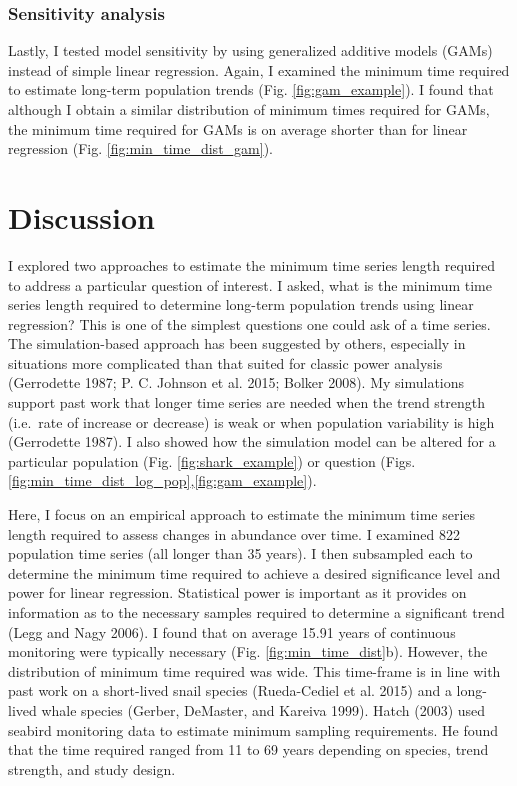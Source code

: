 \documentclass[12pt,]{article}
\begin{document}
\begin{spacing}{2}
\subsubsection{Sensitivity analysis}\label{sensitivity-analysis}

Lastly, I tested model sensitivity by using generalized additive models
(GAMs) instead of simple linear regression. Again, I examined the
minimum time required to estimate long-term population trends (Fig.
\ref{fig:gam_example}). I found that although I obtain a similar
distribution of minimum times required for GAMs, the minimum time
required for GAMs is on average shorter than for linear regression (Fig.
\ref{fig:min_time_dist_gam}).

\section{Discussion}\label{discussion}

I explored two approaches to estimate the minimum time series length
required to address a particular question of interest. I asked, what is
the minimum time series length required to determine long-term
population trends using linear regression? This is one of the simplest
questions one could ask of a time series. The simulation-based approach
has been suggested by others, especially in situations more complicated
than that suited for classic power analysis (Gerrodette 1987; P. C.
Johnson et al. 2015; Bolker 2008). My simulations support past work that
longer time series are needed when the trend strength (i.e.~rate of
increase or decrease) is weak or when population variability is high
(Gerrodette 1987). I also showed how the simulation model can be altered
for a particular population (Fig. \ref{fig:shark_example}) or question
(Figs. \ref{fig:min_time_dist_log_pop},\ref{fig:gam_example}).

Here, I focus on an empirical approach to estimate the minimum time
series length required to assess changes in abundance over time. I
examined 822 population time series (all longer than 35 years). I then
subsampled each to determine the minimum time required to achieve a
desired significance level and power for linear regression. Statistical
power is important as it provides on information as to the necessary
samples required to determine a significant trend (Legg and Nagy 2006).
I found that on average 15.91 years of continuous monitoring were
typically necessary (Fig. \ref{fig:min_time_dist}b). However, the
distribution of minimum time required was wide. This time-frame is in
line with past work on a short-lived snail species (Rueda-Cediel et al.
2015) and a long-lived whale species (Gerber, DeMaster, and Kareiva
1999). Hatch (2003) used seabird monitoring data to estimate minimum
sampling requirements. He found that the time required ranged from 11 to
69 years depending on species, trend strength, and study design.


\end{spacing}
\end{document}
